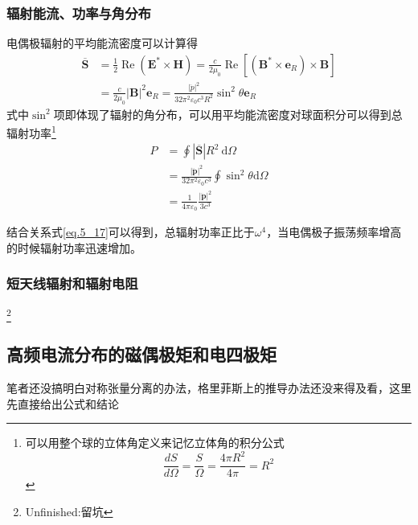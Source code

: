         \subsubsection{辐射能流、功率与角分布}
            电偶极辐射的平均能流密度可以计算得
            \begin{equation}
                \begin{aligned}
                \overline{\boldsymbol{S}} &=\frac{1}{2} \operatorname{Re}\left(\boldsymbol{E}^{*} \times \boldsymbol{H}\right)=\frac{c}{2 \mu_{0}} \operatorname{Re}\left[\left(\boldsymbol{B}^{*} \times \boldsymbol{e}_{R}\right) \times \boldsymbol{B}\right] \\
                &=\frac{c}{2 \mu_{0}}|\boldsymbol{B}|^{2} \boldsymbol{e}_{R}=\frac{|\ddot{p}|^{2}}{32 \pi^{2} \varepsilon_{0} c^{3} R^{2}} \sin ^{2} \theta \boldsymbol{e}_{R} 
                \end{aligned}
                \end{equation}
            式中$\sin^2$项即体现了辐射的角分布，可以用平均能流密度对球面积分可以得到总辐射功率\footnote{可以用整个球的立体角定义来记忆立体角的积分公式\[\frac{d S}{d\Omega}=\frac{S}{\Omega}=\frac{4 \pi R^2}{4 \pi}=R^2\]}
            \begin{equation}
                \begin{aligned}
                P &=\oint|\overline{\boldsymbol{S}}| R^{2} \mathrm{~d} \Omega \\
                &=\frac{|\ddot{\boldsymbol{p}}|^{2}}{32 \pi^{2} \varepsilon_{0} c^{3}} \oint \sin ^{2} \theta \mathrm{d} \Omega \\
                &=\frac{1}{4 \pi \varepsilon_{0}} \frac{|\ddot{\boldsymbol{p}}|^{2}}{3 c^{3}}
                \end{aligned}
            \end{equation}
            
            结合关系式\ref{eq.5_17}可以得到，总辐射功率正比于$\omega^4$，当电偶极子振荡频率增高的时候辐射功率迅速增加。
        
        \subsubsection{短天线辐射和辐射电阻}\footnote{Unfinished:留坑}
    \subsection{高频电流分布的磁偶极矩和电四极矩}
        \textcolor[RGB]{143,143,143}{笔者还没搞明白对称张量分离的办法，格里菲斯上的推导办法还没来得及看，这里先直接给出公式和结论}
        
